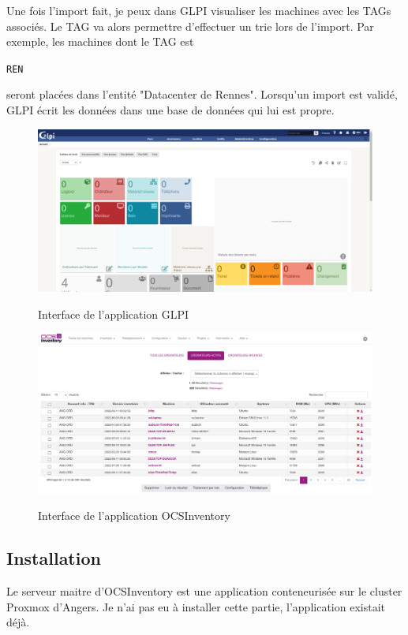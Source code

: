 \documentclass[12pt, a4paper, twoside]{article}
\begin{document}
Une fois l'import fait, je peux dans \gls{GLPI} visualiser les machines avec les TAGs associés. 
Le TAG va alors permettre d'effectuer un trie lors de l'import. 
Par exemple, les machines dont le TAG est \begin{code}\texttt{REN}\end{code} seront placées dans l'entité "Datacenter de Rennes".
Lorsqu'un import est validé, \gls{GLPI} écrit les données dans une base de données qui lui est propre. \\

\begin{figure}[!ht]
    \centering
    \includegraphics[scale=0.2]{src/interface_glpi.png}
    \label{fig:interface_glpi}
    \caption{Interface de l'application \gls{GLPI}}
\end{figure}

\begin{figure}[!ht]
    \centering
    \includegraphics[scale=0.2]{src/interface_ocsinventory.png}
    \label{fig:interface_ocsinventory}
    \caption{Interface de l'application \gls{OCSInventory}}
\end{figure}


\newpage
\subsection{Installation}
Le serveur maitre d'\gls{OCSInventory} est une application conteneurisée sur le \gls{cluster} \gls{Proxmox} d'Angers.
Je n'ai pas eu à installer cette partie, l'application existait déjà.
\end{document}
